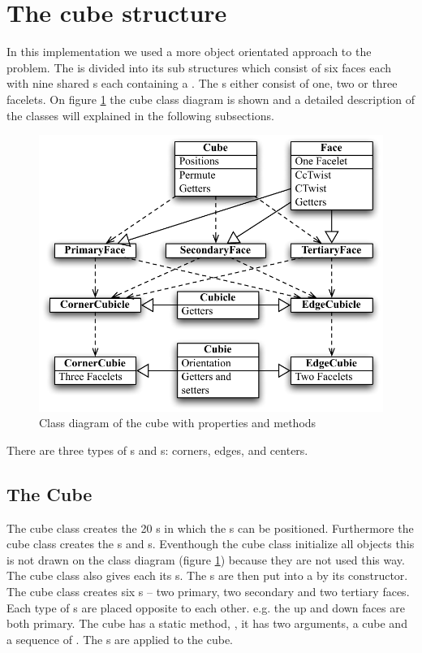 \section{The cube structure}
In this implementation we used a more object orientated approach to the problem.
The \rubik{} is divided into its sub structures which consist of six faces each with nine shared \cubicle{}s each containing a \cubie{}. The \cubie{}s either consist of one, two or three facelets. On figure \ref{fig:cubeClassDiagram} the cube class diagram is shown and a detailed description of the classes will explained in the following subsections.

\begin{figure}[htbp]
	\centering
		\includegraphics[scale=0.75]{input/pics/cubeClassDiagram.pdf}
	\caption{Class diagram of the cube with properties and methods}
	\label{fig:cubeClassDiagram}
\end{figure}


There are three types of \cpiece{}s and \cubicle{}s: corners, edges, and centers. 

\subsection{The Cube}
The cube class creates the 20 \cubicle{}s in which the \cpiece{}s can be positioned. Furthermore the cube class creates the \face{}s and \cubie{}s. Eventhough the cube class initialize all objects this is not drawn on the class diagram (figure \ref{fig:cubeClassDiagram}) because they are not used this way. The cube class also gives each \cpiece{} its \facelet{}s. The \cubicle{}s are then put into a \face{} by its constructor. The cube class creates six \face{}s -- two primary, two secondary and two tertiary faces. Each type of \face{}s are placed opposite to each other. e.g. the up and down faces are both primary. The cube has a static method, , it has two arguments, a cube and a sequence of \twist{}. The \twist{}s are applied to the cube.

